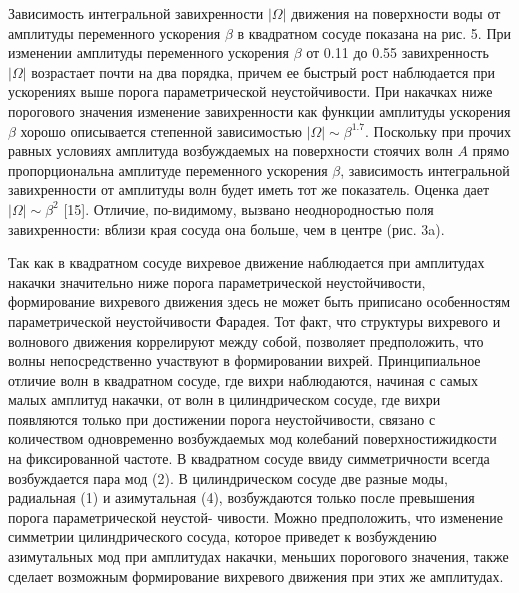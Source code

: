 Зависимость интегральной завихренности $|\Omega|$ движения на поверхности воды от амплитуды переменного ускорения $\beta$ в квадратном сосуде показана на рис. 5. При изменении амплитуды переменного ускорения $\beta$ от 0.11 до 0.55 завихренность $|\Omega|$ возрастает почти на два порядка, причем ее быстрый рост наблюдается при ускорениях выше порога параметрической неустойчивости. При накачках ниже порогового значения изменение завихренности как функции амплитуды ускорения $\beta$ хорошо описывается степенной зависимостью $|\Omega| \sim \beta^{1.7}$. Поскольку при прочих равных условиях амплитуда возбуждаемых на поверхности стоячих волн $A$ прямо пропорциональна амплитуде переменного ускорения $\beta$, зависимость интегральной завихренности от амплитуды волн будет иметь тот же показатель. Оценка дает $|\Omega| \sim \beta^{2}$ [15]. Отличие, по-видимому, вызвано неоднородностью поля завихренности: вблизи края сосуда она больше, чем в центре (рис. 3a).

Так как в квадратном сосуде вихревое движение наблюдается при амплитудах накачки значительно ниже порога параметрической неустойчивости, формирование вихревого движения здесь не может быть приписано особенностям параметрической неустойчивости Фарадея. Тот факт, что структуры вихревого и волнового движения коррелируют между собой, позволяет предположить, что волны непосредственно участвуют в формировании вихрей. Принципиальное отличие волн в квадратном сосуде, где вихри наблюдаются, начиная с самых малых амплитуд накачки, от волн в цилиндрическом сосуде, где вихри появляются только при достижении порога неустойчивости, связано с количеством одновременно возбуждаемых мод колебаний поверхностижидкости на фиксированной частоте. В квадратном сосуде ввиду симметричности всегда возбуждается пара мод (2). В цилиндрическом сосуде две разные моды, радиальная (1) и азимутальная (4), возбуждаются только после превышения порога параметрической неустой- чивости. Можно предположить, что изменение симметрии цилиндрического сосуда, которое приведет к возбуждению азимутальных мод при амплитудах накачки, меньших порогового значения, также сделает возможным формирование вихревого движения при этих же амплитудах.

